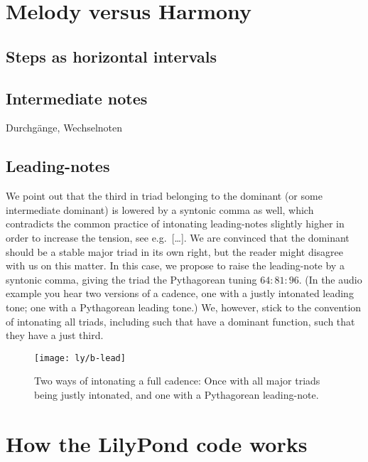 \documentclass[british,11pt]{scrartcl}
\begin{document}
\section{Melody versus Harmony}

\subsection{Steps as horizontal intervals}

\subsection{Intermediate notes}

Durchgänge, Wechselnoten

\subsection{Leading-notes}

We point out that the third in triad belonging to the dominant (or some
intermediate dominant) is lowered by a syntonic comma as well, which contradicts
the common practice of intonating leading-notes slightly higher in order to
increase the tension, see e.g.\ […]. We are convinced that the
dominant should be a stable major triad in its own right, but the reader might
disagree with us on this matter. In this case, we propose to raise the
leading-note by a syntonic comma, giving the triad the Pythagorean tuning
$64:81:96$.  (In the audio example you hear two versions of a cadence, one with
a justly intonated leading tone; one with a Pythagorean leading tone.)  We,
however, stick to the convention of intonating all triads, including such that
have a dominant function, such that they have a just third.

\begin{figure}
  \centering
  \texttt{[image: ly/b-lead]}
  \caption{Two ways of intonating a full cadence: Once with all major triads
    being justly intonated, and one with a Pythagorean leading-note.}\label{fig:lead}
\end{figure}

\appendix

\section{How the LilyPond code works}
\label{sec:ly}
\end{document}
